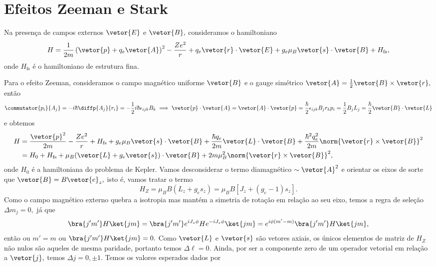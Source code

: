 \section{Efeitos Zeeman e Stark}
Na presença de campos externos \(\vetor{E}\) e \(\vetor{B},\) consideramos o hamiltoniano
\begin{equation*}
   H = \frac1{2m} \left(\vetor{p} + q_e\vetor{A}\right)^2 - \frac{Z e^2}{r} + q_e\vetor{r}\cdot \vetor{E} + g_e \mu_B \vetor{s} \cdot \vetor{B} + H_{\mathrm{fs}},
\end{equation*}
onde \(H_\mathrm{fs}\) é o hamiltoniano de estrutura fina. 

Para o efeito Zeeman, consideramos o campo magnético uniforme \(\vetor{B}\) e o gauge simétrico \(\vetor{A} = \frac12 \vetor{B} \times \vetor{r},\) então
\begin{equation*}
   \commutator{p_i}{A_j} = - i\hbar \diffp{A_j}{r_i} = -\frac12 i\hbar \epsilon_{ijk} B_k \implies \vetor{p}\cdot \vetor{A} = \vetor{A}\cdot \vetor{p} = \frac{\hbar}2 \epsilon_{ijk} B_j r_k p_i = \frac12 B_j L_j = \frac{\hbar}2 \vetor{B} \cdot \vetor{L}
\end{equation*}
e obtemos
\begin{align*}
   H &= \frac{\vetor{p}^2}{2m} - \frac{Ze^2}{r} + H_{\mathrm{fs}} + g_e\mu_B \vetor{s} \cdot \vetor{B} + \frac{\hbar q_e}{2m} \vetor{L} \cdot \vetor{B} +  \frac{\hbar^2q_e^2}{2m}\norm{\vetor{r}\times\vetor{B}}^2\\
     &= H_0 + H_\mathrm{fs} + \mu_B (\vetor{L} + g_e \vetor{s}) \cdot \vetor{B} + 2m \mu_B^2 \norm{\vetor{r}\times \vetor{B}}^2,
\end{align*}
onde \(H_0\) é a hamiltoniana do problema de Kepler. Vamos desconsiderar o termo diamagnético \(\sim \vetor{A}^2\) e orientar os eixos de sorte que \(\vetor{B} = B \vetor{e}_z,\) isto é, vamos tratar o termo
\begin{equation*}
   H_Z = \mu_BB(L_z + g_e s_z) = \mu_B B \left[J_z + (g_e - 1)s_z\right].
\end{equation*}
Como o campo magnético externo quebra a isotropia mas mantém a simetria de rotação em relação ao seu eixo, temos a regra de seleção \(\Delta m_j = 0,\) já que
\begin{equation*}
   \bra{j'm'}H\ket{jm} = \bra{j'm'} e^{i J_z \phi} H e^{-iJ_z \phi}\ket{jm} = e^{i\phi (m' - m)} \bra{j'm'}H\ket{jm},
\end{equation*}
então ou \(m' = m\) ou \(\bra{j'm'}H\ket{jm} = 0.\) Como \(\vetor{L}\) e \(\vetor{s}\) são vetores axiais, os únicos elementos de matriz de \(H_Z\) não nulos são aqueles de mesma paridade, portanto temos \(\Delta \ell = 0.\) Ainda, por ser a componente zero de um operador vetorial em relação a \(\vetor{j},\) temos \(\Delta j = 0, \pm1.\) Temos os valores esperados dados por
